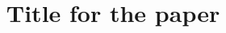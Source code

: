 \documentclass[conference]{IEEEtran}
\begin{document}
%
\title{Title for the paper}




% 
\end{document}

